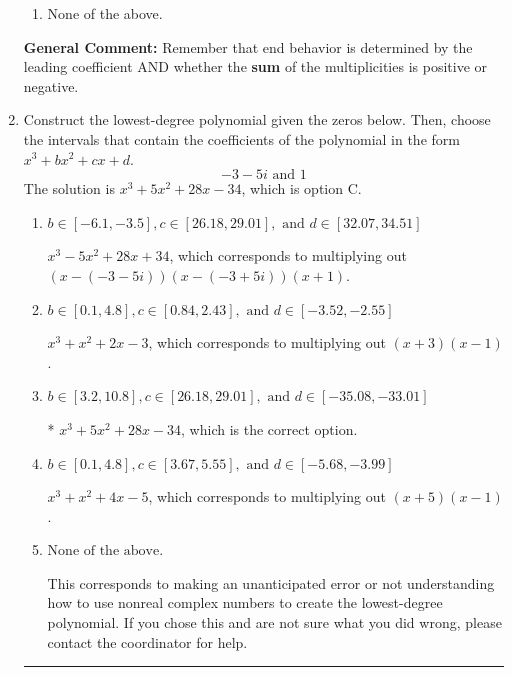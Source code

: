 \documentclass{extbook}[14pt]
\newcommand{\litem}[1]{\item #1

\rule{\textwidth}{0.4pt}}
\begin{document}
\begin{enumerate}
{\begin{enumerate}[label=\Alph*.]
\begin{multicols}{2}
\end{multicols}\item None of the above.\end{enumerate}
\textbf{General Comment:} Remember that end behavior is determined by the leading coefficient AND whether the \textbf{sum} of the multiplicities is positive or negative.
}
\litem{
Construct the lowest-degree polynomial given the zeros below. Then, choose the intervals that contain the coefficients of the polynomial in the form $x^3+bx^2+cx+d$.
\[ -3 - 5 i \text{ and } 1 \]The solution is \( x^{3} +5 x^{2} +28 x -34 \), which is option C.\begin{enumerate}[label=\Alph*.]
\item \( b \in [-6.1, -3.5], c \in [26.18, 29.01], \text{ and } d \in [32.07, 34.51] \)

$x^{3} -5 x^{2} +28 x + 34$, which corresponds to multiplying out $(x-(-3 - 5 i))(x-(-3 + 5 i))(x + 1)$.
\item \( b \in [0.1, 4.8], c \in [0.84, 2.43], \text{ and } d \in [-3.52, -2.55] \)

$x^{3} + x^{2} +2 x -3$, which corresponds to multiplying out $(x + 3)(x -1)$.
\item \( b \in [3.2, 10.8], c \in [26.18, 29.01], \text{ and } d \in [-35.08, -33.01] \)

* $x^{3} +5 x^{2} +28 x -34$, which is the correct option.
\item \( b \in [0.1, 4.8], c \in [3.67, 5.55], \text{ and } d \in [-5.68, -3.99] \)

$x^{3} + x^{2} +4 x -5$, which corresponds to multiplying out $(x + 5)(x -1)$.
\item \( \text{None of the above.} \)

This corresponds to making an unanticipated error or not understanding how to use nonreal complex numbers to create the lowest-degree polynomial. If you chose this and are not sure what you did wrong, please contact the coordinator for help.
\end{enumerate}

}
\end{enumerate}
\end{document}
